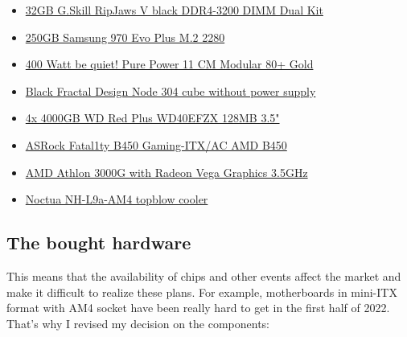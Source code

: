 \begin{itemize}
    \item \href{https://www.gskill.com/product/165/184/1536110922/F4-3200C16D-32GVK}{32GB G.Skill RipJaws V black DDR4-3200 DIMM Dual Kit}
    \item \href{https://www.samsung.com/de/memory-storage/nvme-ssd/970-evo-nvme-m-2-ssd-250gb-mz-v7e250bw/}{250GB Samsung 970 Evo Plus M.2 2280}
    \item \href{https://www.bequiet.com/de/powersupply/1539}{400 Watt be quiet! Pure Power 11 CM Modular 80+ Gold}
    \item \href{https://www.fractal-design.com/de/products/cases/node/node-304/black/}{Black Fractal Design Node 304 cube without power supply}
    \item \href{https://www.westerndigital.com/de-de/products/internal-drives/wd-red-plus-sata-3-5-hdd#WD40EFZX}{4x 4000GB WD Red Plus WD40EFZX 128MB 3.5"}
    \item \href{https://www.asrock.com/mb/AMD/Fatal1ty%20B450%20Gaming-ITXac/index.de.asp}{ASRock Fatal1ty B450 Gaming-ITX/AC AMD B450}
    \item \href{https://www.amd.com/de/products/apu/amd-athlon-3000g}{AMD Athlon 3000G with Radeon Vega Graphics 3.5GHz}
    \item \href{https://noctua.at/en/nh-l9a-am4}{Noctua NH-L9a-AM4 topblow cooler}
\end{itemize}

\subsection{The bought hardware}

\begin{figure}[H]
    \centering
    \begin{Huge}
    \end{Huge}
\end{figure}

This means that the availability of chips and other events affect the market
and make it difficult to realize these plans. For example, motherboards in
mini-ITX format with AM4 socket have been really hard to get in the first half
of 2022. That's why I revised my decision on the components:

